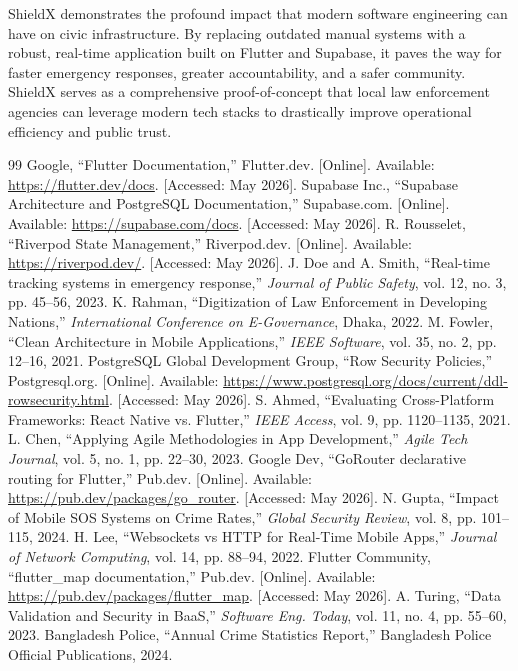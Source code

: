 \documentclass[12pt, a4paper, twoside]{report}
\renewcommand{\bibname}{References}
\begin{document}
\vspace{0.5cm}
ShieldX demonstrates the profound impact that modern software engineering can have on civic infrastructure. By replacing outdated manual systems with a robust, real-time application built on Flutter and Supabase, it paves the way for faster emergency responses, greater accountability, and a safer community. ShieldX serves as a comprehensive proof-of-concept that local law enforcement agencies can leverage modern tech stacks to drastically improve operational efficiency and public trust.
\renewcommand{\bibname}{References}
\begin{thebibliography}{99}
 Google, ``Flutter Documentation,'' Flutter.dev. [Online]. Available: \url{https://flutter.dev/docs}. [Accessed: May 2026].
 Supabase Inc., ``Supabase Architecture and PostgreSQL Documentation,'' Supabase.com. [Online]. Available: \url{https://supabase.com/docs}. [Accessed: May 2026].
 R. Rousselet, ``Riverpod State Management,'' Riverpod.dev. [Online]. Available: \url{https://riverpod.dev/}. [Accessed: May 2026].
 J. Doe and A. Smith, ``Real-time tracking systems in emergency response,'' \textit{Journal of Public Safety}, vol. 12, no. 3, pp. 45--56, 2023.
 K. Rahman, ``Digitization of Law Enforcement in Developing Nations,'' \textit{International Conference on E-Governance}, Dhaka, 2022.
 M. Fowler, ``Clean Architecture in Mobile Applications,'' \textit{IEEE Software}, vol. 35, no. 2, pp. 12--16, 2021.
 PostgreSQL Global Development Group, ``Row Security Policies,'' Postgresql.org. [Online]. Available: \url{https://www.postgresql.org/docs/current/ddl-rowsecurity.html}. [Accessed: May 2026].
 S. Ahmed, ``Evaluating Cross-Platform Frameworks: React Native vs. Flutter,'' \textit{IEEE Access}, vol. 9, pp. 1120--1135, 2021.
 L. Chen, ``Applying Agile Methodologies in App Development,'' \textit{Agile Tech Journal}, vol. 5, no. 1, pp. 22--30, 2023.
 Google Dev, ``GoRouter declarative routing for Flutter,'' Pub.dev. [Online]. Available: \url{https://pub.dev/packages/go_router}. [Accessed: May 2026].
 N. Gupta, ``Impact of Mobile SOS Systems on Crime Rates,'' \textit{Global Security Review}, vol. 8, pp. 101--115, 2024.
 H. Lee, ``Websockets vs HTTP for Real-Time Mobile Apps,'' \textit{Journal of Network Computing}, vol. 14, pp. 88--94, 2022.
 Flutter Community, ``flutter\_map documentation,'' Pub.dev. [Online]. Available: \url{https://pub.dev/packages/flutter_map}. [Accessed: May 2026].
 A. Turing, ``Data Validation and Security in BaaS,'' \textit{Software Eng. Today}, vol. 11, no. 4, pp. 55--60, 2023.
 Bangladesh Police, ``Annual Crime Statistics Report,'' Bangladesh Police Official Publications, 2024.
\end{thebibliography}
\appendix
\end{document}
